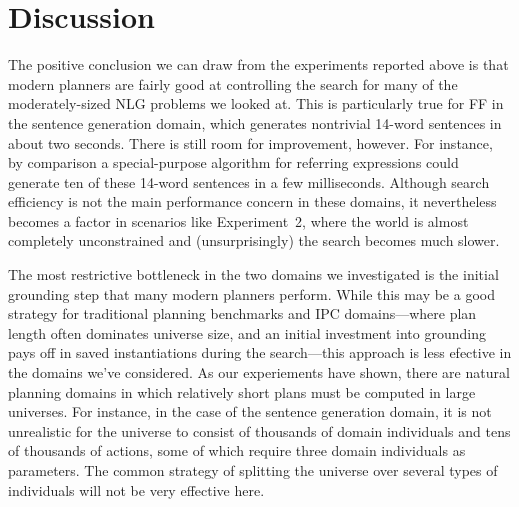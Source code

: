 \section{Discussion} \label{sec:discussion}

The positive conclusion we can draw from the experiments reported above is
that modern planners are fairly good at controlling the search for many of
the moderately-sized NLG problems we looked at. This is particularly true
for FF in the sentence generation domain, which generates nontrivial
14-word sentences in about two seconds. There is still room for
improvement, however. For instance, by comparison a special-purpose
algorithm for referring expressions could generate ten of these 14-word
sentences in a few milliseconds. Although search efficiency is not the main
performance concern in these domains, it nevertheless becomes a factor in
scenarios like Experiment~2, where the world is almost completely
unconstrained and (unsurprisingly) the search becomes much slower.


The most restrictive bottleneck in the two domains we investigated is the
initial grounding step that many modern planners perform. While this may be
a good strategy for traditional planning benchmarks and IPC domains---where
plan length often dominates universe size, and an initial investment into
grounding pays off in saved instantiations during the search---this
approach is less efective in the domains we've considered. As our
experiements have shown, there are natural planning domains in which
relatively short plans must be computed in large universes. For instance,
in the case of the sentence generation domain, it is not unrealistic for
the universe to consist of thousands of domain individuals and tens of
thousands of actions, some of which require three domain individuals as
parameters. The common strategy of splitting the universe over several
types of individuals will not be very effective here.

